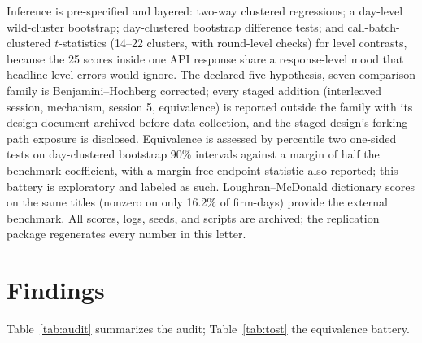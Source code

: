 \documentclass[11pt]{article}
\begin{document}
Inference is pre-specified and layered: two-way clustered regressions; a day-level wild-cluster bootstrap; day-clustered bootstrap difference tests; and call-batch-clustered $t$-statistics (14--22 clusters, with round-level checks) for level contrasts, because the 25 scores inside one API response share a response-level mood that headline-level errors would ignore. The declared five-hypothesis, seven-comparison family is Benjamini--Hochberg corrected; every staged addition (interleaved session, mechanism, session 5, equivalence) is reported outside the family with its design document archived before data collection, and the staged design's forking-path exposure is disclosed. Equivalence is assessed by percentile two one-sided tests on day-clustered bootstrap 90\% intervals against a margin of half the benchmark coefficient, with a margin-free endpoint statistic also reported; this battery is exploratory and labeled as such. Loughran--McDonald dictionary scores on the same titles (nonzero on only 16.2\% of firm-days) provide the external benchmark. All scores, logs, seeds, and scripts are archived; the replication package regenerates every number in this letter.

\section{Findings}

Table~\ref{tab:audit} summarizes the audit; Table~\ref{tab:tost} the equivalence battery.
\end{document}
